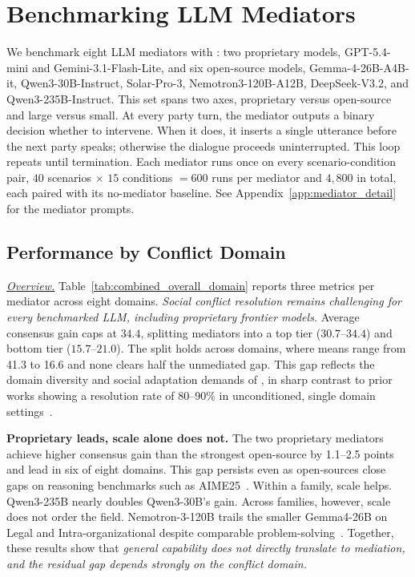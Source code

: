 \section{Benchmarking LLM Mediators}
\label{sec:experiments}

We benchmark eight LLM mediators with \algname{}: two proprietary models, GPT-5.4-mini and Gemini-3.1-Flash-Lite, and six open-source models, Gemma-4-26B-A4B-it, Qwen3-30B-Instruct, Solar-Pro-3, Nemotron3-120B-A12B, DeepSeek-V3.2, and Qwen3-235B-Instruct. This set spans two axes, proprietary versus open-source and large versus small. At every party turn, the mediator outputs a binary decision whether to intervene. When it does, it inserts a single utterance before the next party speaks; otherwise the dialogue proceeds uninterrupted. This loop repeats until termination.
%
Each mediator runs once on every scenario-condition pair, $40$ scenarios $\times$ $15$ conditions $= 600$ runs per mediator and $4{,}800$ in total, each paired with its no-mediator baseline. See Appendix~\ref{app:mediator_detail} for the mediator prompts.



\subsection{Performance by Conflict Domain}
\label{sec:results:domain}

\noindent\underline{\textit{Overview.}} Table~\ref{tab:combined_overall_domain} reports three metrics per mediator across eight domains. \emph{Social conflict resolution remains challenging for every benchmarked LLM, including proprietary frontier models.} Average consensus gain caps at $34.4$, splitting mediators into a top tier ($30.7$--$34.4$) and bottom tier ($15.7$--$21.0$). The split holds across domains, where means range from 41.3 to 16.6 and none clears half the unmediated gap. This gap reflects the domain diversity and social adaptation demands of \algname{}, in sharp contrast to prior works showing a resolution rate of 80--90\% in unconditioned, single domain settings~\citep{kwon2025evaluating, chen2026simulating}.


\smallskip\smallskip\noindent\textbf{Proprietary leads, scale alone does not.} The two proprietary mediators achieve higher consensus gain than the strongest open-source by 1.1--2.5 points and lead in six of eight domains. This gap persists even as open-sources close gaps on reasoning benchmarks such as AIME25~\citep{dekoninck2026matharena}. Within a family, scale helps. Qwen3-235B nearly doubles Qwen3-30B's gain. Across families, however, scale does not order the field. Nemotron-3-120B trails the smaller Gemma4-26B on Legal and Intra-organizational despite comparable problem-solving~\citep{chandiramani2026nemotron}. Together, these results show that \emph{general capability does not directly translate to mediation, and the residual gap depends strongly on the conflict domain.}

